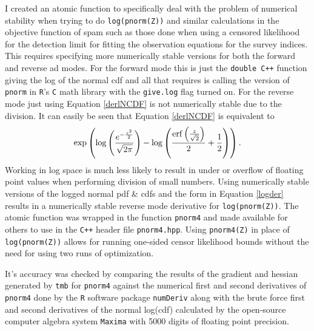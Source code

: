 \documentclass[11pt]{article}\usepackage[]{graphicx}\usepackage[]{color}
\begin{document}
\begin{appendices}
  I created an atomic function to specifically deal with the problem of numerical stability when trying to do \texttt{log(pnorm(Z))} and similar calculations in the objective function of \acrshort{spam} such as those done when using a censored likelihood for the detection limit for fitting the observation equations for the survey indices. This requires specifying more numerically stable versions for both the forward and reverse \acrshort{ad} modes. For the forward mode this is just the \texttt{double C++} function giving the log of the normal \acrshort{cdf} and all that requires is calling the version of \texttt{pnorm} in \texttt{R}'s \texttt{C} math library with the \texttt{give.log} flag turned on. For the reverse mode just using Equation \ref{derlNCDF} is not numerically stable due to the division. It can easily be seen that Equation \ref{derlNCDF} is equivalent to 
  \begin{equation}\label{logder}
    \exp \left (\log \left({{e^ {- {{z^2}\over{2}} }}\over{\sqrt{2\pi}}}
      \right) - \log \left({{\mathrm{erf}\left({{z}\over{\sqrt{2}}}\right)}\over{2
          }}+{{1}\over{2}}\right) \right).
  \end{equation}
  Working in log space is much less likely to result in under or overflow of floating point values when performing division of small numbers. Using numerically stable versions of the logged normal \acrshort{pdf} \& \acrshort{cdf}s and the form in Equation \ref{logder} results in a numerically stable reverse mode derivative for \texttt{log(pnorm(Z))}. The atomic function was wrapped in the function \texttt{pnorm4} and made available for others to use in the \texttt{C++} header file \texttt{pnorm4.hpp}. Using \texttt{pnorm4(Z)} in place of \texttt{log(pnorm(Z))} allows for running one-sided censor likelihood bounds without the need for using two runs of optimization.
  
  It's accuracy was checked by comparing the results of the gradient and hessian generated by \texttt{\acrshort{tmb}} for \texttt{pnorm4} against the numerical first and second derivatives of \texttt{pnorm4} done by the \texttt{R} software package \texttt{numDeriv} along with the brute force first and second derivatives of the normal log(\acrshort{cdf}) calculated by the open-source computer algebra system \texttt{Maxima} with 5000 digits of floating point precision. 


\end{appendices}
\end{document}
